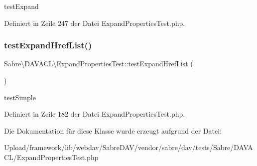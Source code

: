 test\+Expand 

Definiert in Zeile 247 der Datei Expand\+Properties\+Test.\+php.

\mbox{\label{class_sabre_1_1_d_a_v_a_c_l_1_1_expand_properties_test_a31968a48c8a6a6034c33011d928348aa}} 
\subsubsection{\texorpdfstring{test\+Expand\+Href\+List()}{testExpandHrefList()}}
{\footnotesize\ttfamily Sabre\textbackslash{}\+D\+A\+V\+A\+C\+L\textbackslash{}\+Expand\+Properties\+Test\+::test\+Expand\+Href\+List (\begin{DoxyParamCaption}{ }\end{DoxyParamCaption})}

test\+Simple 

Definiert in Zeile 182 der Datei Expand\+Properties\+Test.\+php.



Die Dokumentation für diese Klasse wurde erzeugt aufgrund der Datei\+:\begin{DoxyCompactItemize}
\item 
Upload/framework/lib/webdav/\+Sabre\+D\+A\+V/vendor/sabre/dav/tests/\+Sabre/\+D\+A\+V\+A\+C\+L/Expand\+Properties\+Test.\+php\end{DoxyCompactItemize}
